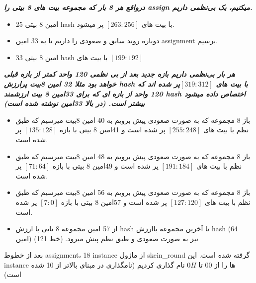 \textit{\textbf{درواقع هر 8 بار که مجموعه بیت های 8 بیتی را assign میکنیم، یک بی‌نظمی داریم.
}}
\begin{itemize}
	\item
	      25 امین 8 بیتی hash با بیت های $[263:256]$ پر میشود.
	\item
	      دوباره روند سابق و صعودی را داریم تا به 33 امین assignment برسیم.
	\item
	      33 امین 8 بیتی hash با بیت های $[199:192]$
	      
\end{itemize}

\textit{\textbf{هر بار بی‌نظمی داریم بازه جدید بعد از بی نظمی 120 واحد کمتر از بازه قبلی خواهد بود مثلا 32 امین 8بیت پرارزش hash با بیت های $[319:312] $پر شده اند که 120 واحد از بازه ای که برای 33امین 8 بیت ارزشمند hash اختصاص داده میشود بیشتر است. (در بالا 33امین نوشته شده است)}}

\begin{itemize}
	\item
	      باز 8 مجموعه که به صورت صعودی پیش برویم به 40 امین 8بیت میرسیم که طبق نظم با بیت های $[255:248]$ پر شده است و 41امین 8 بیتی با بازه $[135:128]$ پر شده است.
	\item
	      باز 8 مجموعه که به صورت صعودی پیش برویم به 48 امین 8بیت میرسیم که طبق نظم با بیت های $[191:184]$ پر شده است و 49امین 8 بیتی با بازه $[71:64]$ پر شده است.
	\item
	      باز 8 مجموعه که به صورت صعودی پیش برویم به 56 امین 8بیت میرسیم که طبق نظم با بیت های $[127:120]$ پر شده است و 57امین 8 بیتی با بازه $[7:0]$ پر شده است.
	\item
	      از 57 امین مجموعه 8 تایی با ارزش hash تا آخرین مجموعه باارزش hash (64 امین) نیز به صورت صعودی و طبق نظم پیش میرود. (خط 121)
	      
\end{itemize}

بعد از خطوط assignment، 18 instance از ماژول skein\_round گرفته شده است.
این instance ها را از 
$00$
تا
$0H$
نام گذاری کردیم (نامگذاری در مبنای بالاتر از 10 شده است)

